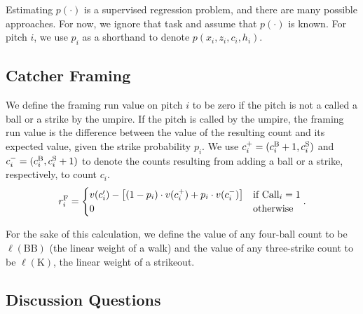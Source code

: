 \documentclass{article}
\begin{document}
    Estimating $p(\cdot)$ is a supervised regression problem, and there are many possible approaches. For now, we ignore that task and assume that $p(\cdot)$ is known. For pitch $i$, we use $p_i$ as a shorthand to denote $p(x_i, z_i, c_i, h_i)$.

  \subsection{\sc Catcher Framing}

    We define the framing run value on pitch $i$ to be zero if the pitch is not a called a ball or a strike by the umpire. If the pitch is called by the umpire, the framing run value is the difference between the value of the resulting count and its expected value, given the strike probability $p_i$. We use $c_i^+ = (c_i^{\mbox{\scriptsize B}} + 1, c_i^{\mbox{\scriptsize S}})$ and $c_i^- = (c_i^{\mbox{\scriptsize B}}, c_i^{\mbox{\scriptsize S}} + 1)$ to denote the counts resulting from adding a ball or a strike, respectively, to count $c_i$.
    \begin{equation*}
      r_i^{\mbox{\scriptsize F}} = \begin{cases}
        v(c'_i) - \left[(1 - p_i) \cdot v(c_i^+) + p_i \cdot v(c_i^-)\right] & \mbox{if Call}_i = 1\\
        0 & \mbox{otherwise}
      \end{cases}.
    \end{equation*}

    For the sake of this calculation, we define the value of any four-ball count to be $\ell(\mbox{BB})$ (the linear weight of a walk) and the value of any three-strike count to be $\ell(\mbox{K})$, the linear weight of a strikeout.

  \subsection{\sc Discussion Questions}
\end{document}
